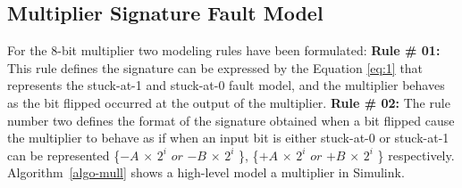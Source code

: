 \subsection{Multiplier Signature Fault Model}
For the 8-bit multiplier two modeling rules have been formulated:
\textbf{Rule \# 01:} This rule defines the signature can be expressed by the Equation \ref{eq:1} that represents the stuck-at-1 and stuck-at-0 fault model, and the multiplier behaves as the bit flipped occurred at the output of the multiplier. 
\textbf{Rule \# 02:} The rule number two defines the format of the signature obtained when a bit flipped cause the multiplier to behave as if when an input bit is either stuck-at-0 or stuck-at-1 can be represented \{$-$$A$ $\times$ $2^{i}$ $or$  $-$$B$ $\times$ $2^{i}$ \}, \{$+$$A$ $\times$ $2^{i}$ $or$  $+$$B$ $\times$ $2^{i}$ \} respectively. Algorithm~\ref{algo-mull} shows a high-level model a multiplier in Simulink.





